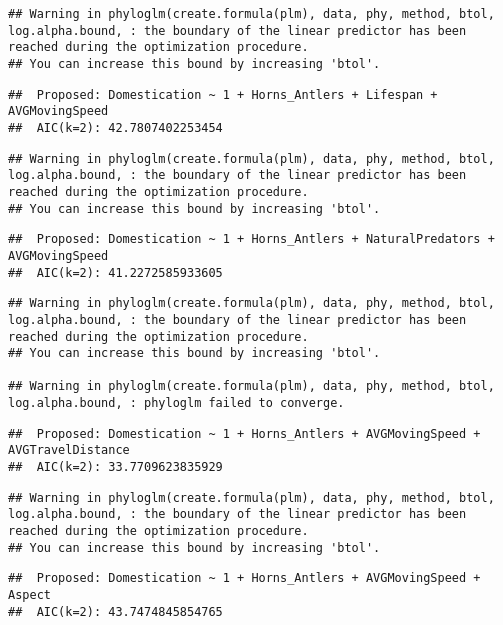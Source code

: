 \documentclass[
]{article}
\begin{document}
\begin{verbatim}
## Warning in phyloglm(create.formula(plm), data, phy, method, btol, log.alpha.bound, : the boundary of the linear predictor has been reached during the optimization procedure.
## You can increase this bound by increasing 'btol'.
\end{verbatim}

\begin{verbatim}
##  Proposed: Domestication ~ 1 + Horns_Antlers + Lifespan + AVGMovingSpeed
##  AIC(k=2): 42.7807402253454
\end{verbatim}

\begin{verbatim}
## Warning in phyloglm(create.formula(plm), data, phy, method, btol, log.alpha.bound, : the boundary of the linear predictor has been reached during the optimization procedure.
## You can increase this bound by increasing 'btol'.
\end{verbatim}

\begin{verbatim}
##  Proposed: Domestication ~ 1 + Horns_Antlers + NaturalPredators + AVGMovingSpeed
##  AIC(k=2): 41.2272585933605
\end{verbatim}

\begin{verbatim}
## Warning in phyloglm(create.formula(plm), data, phy, method, btol, log.alpha.bound, : the boundary of the linear predictor has been reached during the optimization procedure.
## You can increase this bound by increasing 'btol'.

## Warning in phyloglm(create.formula(plm), data, phy, method, btol, log.alpha.bound, : phyloglm failed to converge.
\end{verbatim}

\begin{verbatim}
##  Proposed: Domestication ~ 1 + Horns_Antlers + AVGMovingSpeed + AVGTravelDistance
##  AIC(k=2): 33.7709623835929
\end{verbatim}

\begin{verbatim}
## Warning in phyloglm(create.formula(plm), data, phy, method, btol, log.alpha.bound, : the boundary of the linear predictor has been reached during the optimization procedure.
## You can increase this bound by increasing 'btol'.
\end{verbatim}

\begin{verbatim}
##  Proposed: Domestication ~ 1 + Horns_Antlers + AVGMovingSpeed + Aspect
##  AIC(k=2): 43.7474845854765
\end{verbatim}
\end{document}
